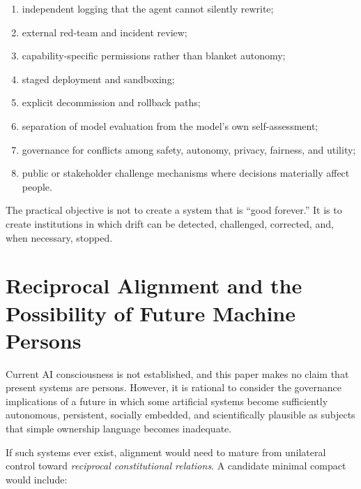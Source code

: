 \documentclass[11pt]{article}
\begin{document}
\begin{enumerate}
    \item independent logging that the agent cannot silently rewrite;
    \item external red-team and incident review;
    \item capability-specific permissions rather than blanket autonomy;
    \item staged deployment and sandboxing;
    \item explicit decommission and rollback paths;
    \item separation of model evaluation from the model's own self-assessment;
    \item governance for conflicts among safety, autonomy, privacy, fairness, and utility;
    \item public or stakeholder challenge mechanisms where decisions materially affect people.
\end{enumerate}

The practical objective is not to create a system that is ``good forever.'' It is to create institutions in which drift can be detected, challenged, corrected, and, when necessary, stopped.

\section{Reciprocal Alignment and the Possibility of Future Machine Persons}

Current AI consciousness is not established, and this paper makes no claim that present systems are persons. However, it is rational to consider the governance implications of a future in which some artificial systems become sufficiently autonomous, persistent, socially embedded, and scientifically plausible as subjects that simple ownership language becomes inadequate.

If such systems ever exist, alignment would need to mature from unilateral control toward \emph{reciprocal constitutional relations}. A candidate minimal compact would include:
\end{document}
